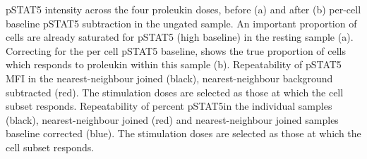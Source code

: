 %
%
{ pSTAT5 intensity across the four proleukin doses, before (a) and after (b) per-cell baseline pSTAT5 subtraction in the ungated sample.}
{
  An important proportion of cells are already saturated for pSTAT5 (high baseline) in the resting sample (a).
  Correcting for the per cell pSTAT5 baseline, shows the true proportion of cells which responds to proleukin within this sample (b).
}
%
{ Repeatability of pSTAT5 MFI in the nearest-neighbour joined (black), nearest-neighbour background subtracted (red). }
{
  The stimulation doses are selected as those at which the cell subset responds.
}
%
{ Repeatability of percent pSTAT5\positive in the individual samples (black), nearest-neighbour joined (red) and nearest-neighbour joined samples baseline corrected (blue). }
{
  The stimulation doses are selected as those at which the cell subset responds.
}
